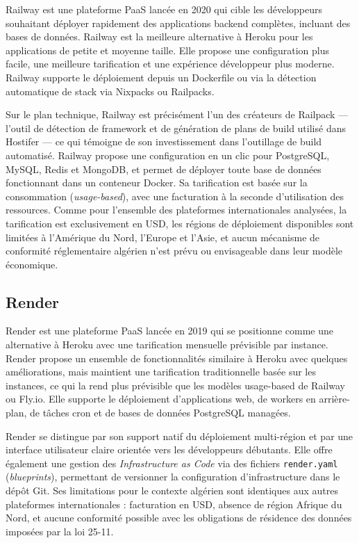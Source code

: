 Railway est une plateforme PaaS lancée en 2020 qui cible les développeurs souhaitant déployer rapidement des applications backend complètes, incluant des bases de données. Railway est la meilleure alternative à Heroku pour les applications de petite et moyenne taille. Elle propose une configuration plus facile, une meilleure tarification et une expérience développeur plus moderne. Railway supporte le déploiement depuis un Dockerfile ou via la détection automatique de stack via Nixpacks ou Railpacks. 

Sur le plan technique, Railway est précisément l'un des créateurs de Railpack — l'outil de détection de framework et de génération de plans de build utilisé dans Hostifer — ce qui témoigne de son investissement dans l'outillage de build automatisé. Railway propose une configuration en un clic pour PostgreSQL, MySQL, Redis et MongoDB, et permet de déployer toute base de données fonctionnant dans un conteneur Docker.  Sa tarification est basée sur la consommation (\textit{usage-based}), avec une facturation à la seconde d'utilisation des ressources. Comme pour l'ensemble des plateformes internationales analysées, la tarification est exclusivement en USD, les régions de déploiement disponibles sont limitées à l'Amérique du Nord, l'Europe et l'Asie, et aucun mécanisme de conformité réglementaire algérien n'est prévu ou envisageable dans leur modèle économique.

\subsection*{Render}

Render est une plateforme PaaS lancée en 2019 qui se positionne comme une alternative à Heroku avec une tarification mensuelle prévisible par instance. Render propose un ensemble de fonctionnalités similaire à Heroku avec quelques améliorations, mais maintient une tarification traditionnelle basée sur les instances, ce qui la rend plus prévisible que les modèles usage-based de Railway ou Fly.io.  Elle supporte le déploiement d'applications web, de workers en arrière-plan, de tâches cron et de bases de données PostgreSQL managées.

Render se distingue par son support natif du déploiement multi-région et par une interface utilisateur claire orientée vers les développeurs débutants. Elle offre également une gestion des \textit{Infrastructure as Code} via des fichiers \texttt{render.yaml} (\textit{blueprints}), permettant de versionner la configuration d'infrastructure dans le dépôt Git. Ses limitations pour le contexte algérien sont identiques aux autres plateformes internationales : facturation en USD, absence de région Afrique du Nord, et aucune conformité possible avec les obligations de résidence des données imposées par la loi 25-11.

